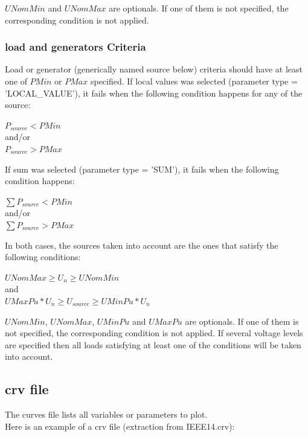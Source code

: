 \documentclass[a4paper, 12pt]{report}
\begin{document}
$UNomMin$ and $UNomMax$ are optionals. If one of them is not
specified, the corresponding condition is not applied.

\subsubsection{load and generators Criteria}

Load or generator (generically named source below) criteria should have at least
one of $PMin$ or $PMax$ specified.
If local values was selected  (parameter type = 'LOCAL\_VALUE'), it fails when
the following condition happens for any of the source:\\
\begin{center}
$P_{source} < PMin$\\
and/or\\
$P_{source} > PMax$\\
\end{center}
If sum was selected  (parameter type = 'SUM'), it fails when the
following condition happens: \\
\begin{center}
$\sum P_{source} < PMin$\\
and/or\\
$\sum P_{source} > PMax$ \\
\end{center}
In both cases, the sources taken into account are the ones that satisfy the
following conditions:\\
\begin{center}
$UNomMax \ge U_n \ge UNomMin$\\
and\\
$UMaxPu*U_n \ge U_{source} \ge UMinPu*U_n$ \\
\end{center}

$UNomMin$, $UNomMax$, $UMinPu$ and $UMaxPu$ are optionals. If one of them is not
specified, the corresponding condition is not applied.
If several voltage levels are specified then all loads satisfying at least one of the conditions will be taken into account.

\subsection{crv file}

The curves file lists all variables or parameters to plot. \\

Here is an example of a crv file (extraction from IEEE14.crv):

\end{document}
